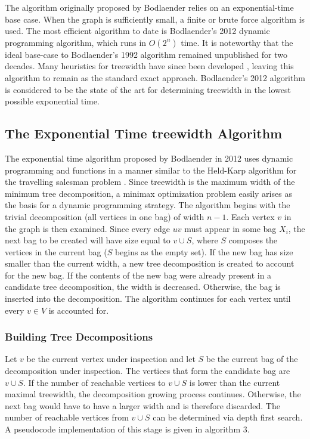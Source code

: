 \documentclass[12pt,conference]{IEEEtran}
\theoremstyle{plain}
\begin{document}
The algorithm originally proposed by Bodlaender relies on an exponential-time base case. When the graph is sufficiently small, a finite or brute force algorithm is used. The most efficient algorithm to date is Bodlaender's 2012 dynamic programming algorithm, which runs in $O(2^{n})$ time. It is noteworthy that the ideal base-case to Bodlaender's 1992 algorithm remained unpublished for two decades. Many heuristics for treewidth have since been developed \cite{treewidth-heuristics-survey}, leaving this algorithm to remain as the standard exact approach. Bodlaender's 2012 algorithm is considered to be the state of the art for determining treewidth in the lowest possible exponential time.

\subsection{The Exponential Time treewidth Algorithm}

The exponential time algorithm proposed by Bodlaender in 2012 uses dynamic programming and functions in a manner similar to the Held-Karp algorithm for the travelling salesman problem \cite{bodlaender-2012}. Since treewidth is the maximum width of the minimum tree decomposition, a minimax optimization problem easily arises as the basis for a dynamic programming strategy. The algorithm begins with the trivial decomposition (all vertices in one bag) of width $n-1$. Each vertex $v$ in the graph is then examined. Since every edge $uv$ must appear in some bag $X_{i}$, the next bag to be created will have size equal to $v\cup S$, where $S$ composes the vertices in the current bag ($S$ begins as the empty set). If the new bag has size smaller than the current width, a new tree decomposition is created to account for the new bag. If the contents of the new bag were already present in a candidate tree decomposition, the width is decreased. Otherwise, the bag is inserted into the decomposition. The algorithm continues for each vertex until every $v\in V$ is accounted for.

\subsubsection{Building Tree Decompositions}

Let $v$ be the current vertex under inspection and let $S$ be the current bag of the decomposition under inspection. The vertices that form the candidate bag are $v\cup S$. If the number of reachable vertices to $v\cup S$ is lower than the current maximal treewidth, the decomposition growing process continues. Otherwise, the next bag would have to have a larger width and is therefore discarded. The number of reachable vertices from $v\cup S$ can be determined via depth first search. A pseudocode implementation of this stage is given in algorithm 3.
\end{document}
